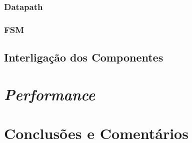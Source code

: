 \documentclass[a4paper]{article}
\begin{document}
\subsubsection{Datapath}

\subsubsection{FSM}

\subsection{Interligação dos Componentes}	%

\section{\textit{Performance}}	%

\section{Conclusões e Comentários}
\end{document}
